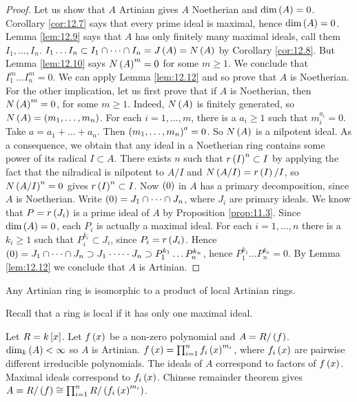 \begin{proof}
Let us show that $ A $ Artinian gives $ A $ Noetherian and $ \dim\rb{A} = 0 $. Corollary \ref{cor:12.7} says that every prime ideal is maximal, hence $ \dim\rb{A} = 0 $. Lemma \ref{lem:12.9} says that $ A $ has only finitely many maximal ideals, call them $ I_1, \dots, I_n $. $ I_1 \dots I_n \subset I_1 \cap \dots \cap I_n = J\rb{A} = N\rb{A} $ by Corollary \ref{cor:12.8}. But Lemma \ref{lem:12.10} says $ N\rb{A}^m = 0 $ for some $ m \ge 1 $. We conclude that $ I_1^m \dots I_n^m = 0 $. We can apply Lemma \ref{lem:12.12} and so prove that $ A $ is Noetherian. For the other implication, let us first prove that if $ A $ is Noetherian, then $ N\rb{A}^m = 0 $, for some $ m \ge 1 $. Indeed, $ N\rb{A} $ is finitely generated, so $ N\rb{A} = \rb{m_1, \dots, m_n} $. For each $ i = 1, \dots, m $, there is a $ a_i \ge 1 $ such that $ m_i^{a_i} = 0 $. Take $ a = a_1 + \dots + a_n $. Then $ \rb{m_1, \dots, m_n}^a = 0 $. So $ N\rb{A} $ is a nilpotent ideal. As a consequence, we obtain that any ideal in a Noetherian ring contains some power of its radical $ I \subset A $. There exists $ n $ such that $ r\rb{I}^n \subset I $ by applying the fact that the nilradical is nilpotent to $ A / I $ and $ N\rb{A / I} = r\rb{I} / I $, so $ N\rb{A / I}^n = 0 $ gives $ r\rb{I}^n \subset I $. Now $ \rb{0} $ in $ A $ has a primary decomposition, since $ A $ is Noetherian. Write $ \rb{0} = J_1 \cap \dots \cap J_n $, where $ J_i $ are primary ideals. We know that $ P = r\rb{J_i} $ is a prime ideal of $ A $ by Proposition \ref{prop:11.3}. Since $ \dim\rb{A} = 0 $, each $ P_i $ is actually a maximal ideal. For each $ i = 1, \dots, n $ there is a $ k_i \ge 1 $ such that $ P_i^{k_i} \subset J_i $, since $ P_i = r\rb{J_i} $. Hence $ \rb{0} = J_1 \cap \dots \cap J_n \supset J_1 \cdot \dots \cdot J_n \supset P_1^{k_1} \dots P_n^{k_n} $, hence $ P_1^{k_1} \dots P_n^{k_n} = 0 $. By Lemma \ref{lem:12.12} we conclude that $ A $ is Artinian.
\end{proof}


\begin{theorem}
\label{thm:12.15}
Any Artinian ring is isomorphic to a product of local Artinian rings.
\end{theorem}

Recall that a ring is local if it has only one maximal ideal.

\begin{example*}
Let $ R = k\sb{x} $. Let $ f\rb{x} $ be a non-zero polynomial and $ A = R / \rb{f} $. $ \dim_k\rb{A} < \infty $ so $ A $ is Artinian. $ f\rb{x} = \prod_{i = 1}^n f_i\rb{x}^{m_i} $, where $ f_i\rb{x} $ are pairwise different irreducible polynomials. The ideals of $ A $ correspond to factors of $ f\rb{x} $. Maximal ideals correspond to $ f_i\rb{x} $. Chinese remainder theorem gives $ A = R / \rb{f} \cong \prod_{i = 1}^n R / \rb{f_i\rb{x}^{m_i}} $.
\end{example*}

